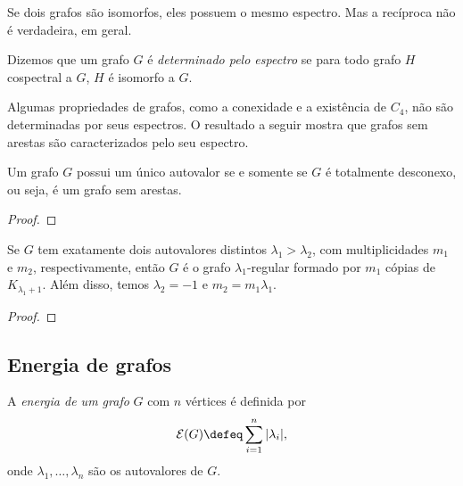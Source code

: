 \documentclass{article}
\begin{document}
Se dois grafos são isomorfos, eles possuem o mesmo espectro. Mas a recíproca não é verdadeira, em geral.

\begin{defn}
    Dizemos que um grafo \(G\) é \emph{determinado pelo espectro} se para todo grafo \(H\) cospectral a \(G\), \(H\) é isomorfo a \(G\).
\end{defn}

\begin{center}
\end{center}

Algumas propriedades de grafos, como a conexidade e a existência de \(C_4\), não são determinadas por seus espectros. O resultado a seguir mostra que grafos sem arestas são caracterizados pelo seu espectro.

\begin{prop}
    Um grafo \(G\) possui um único autovalor se e somente se \(G\) é totalmente desconexo, ou seja, é um grafo sem arestas.
\end{prop}

\begin{proof}
    
\end{proof}

\begin{prop}
    Se \(G\) tem exatamente dois autovalores distintos \(\lambda_1 > \lambda_2\), com multiplicidades \(m_1\) e \(m_2\), respectivamente, então \(G\) é o grafo \(\lambda_1\)-regular formado por \(m_1\) cópias de \(K_{\lambda_1 + 1}\). Além disso, temos \(\lambda_2 = -1\) e \(m_2 = m_1\lambda_1\).
\end{prop}

\begin{proof}
    
\end{proof}

\subsection{Energia de grafos}

\begin{defn}
    A \emph{energia de um grafo} \(G\) com \(n\) vértices é definida por
\[
    \mathcal{E}(G) \defeq \sum_{i=1}^n |\lambda_i|,
\]
onde \(\lambda_1, \ldots, \lambda_n\) são os autovalores de \(G\).
\end{defn}
\end{document}

